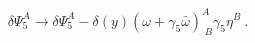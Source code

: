 \begin{equation} 
  \delta\Psi^A_5 \longrightarrow\delta\Psi^A_5-\delta(y)(\omega+\gamma_5\bar{\omega})^{A}_{\;B}\gamma_5\eta^B\ .
  \end{equation} 
